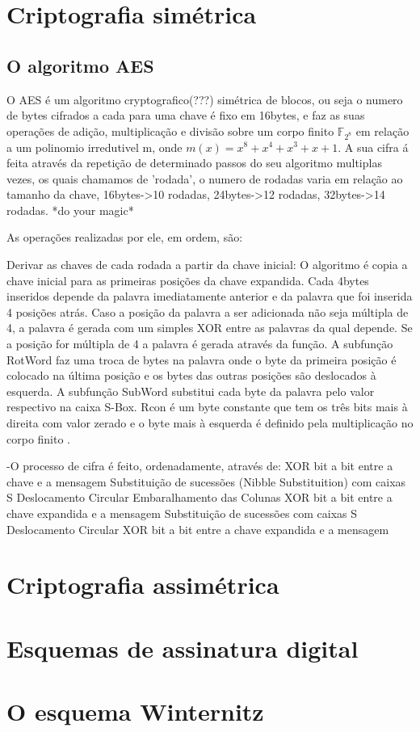 \documentclass{article}
\begin{document}
\section*{Criptografia simétrica}

\subsection*{O algoritmo AES}

O AES é um algoritmo cryptografico(???) simétrica de blocos, ou seja o numero de bytes cifrados a cada para uma chave é fixo em 16bytes, e faz as suas operações de adição, multiplicação e divisão sobre um corpo finito $\mathbb{F}_{2^{8}}$ em relação a um polinomio irredutivel m, onde $m(x) = x^{8} + x^{4} + x^{3} + x + 1$. 
A sua cifra á feita através da repetição de determinado passos do seu algoritmo multiplas vezes, os quais chamamos de 'rodada', o numero de rodadas varia em relação ao tamanho da chave, 16bytes->10 rodadas, 24bytes->12 rodadas, 32bytes->14 rodadas. *do your magic*


As operações realizadas por ele, em ordem, são:

\begin{itemize}

Derivar as chaves de cada rodada a partir da chave inicial: O algoritmo é copia a chave inicial para as primeiras posições da chave expandida. Cada 4bytes inseridos depende da palavra imediatamente anterior e da palavra que foi inserida 4 posições atrás. Caso a posição da palavra a ser adicionada não seja múltipla de 4, a palavra é gerada com um simples XOR entre as palavras da qual depende. Se a posição for múltipla de 4 a palavra é gerada através da função. A subfunção RotWord faz uma troca de bytes na palavra onde o byte da primeira posição é colocado na última posição e os bytes das outras posições são deslocados à esquerda. A subfunção SubWord substitui cada byte da palavra pelo valor respectivo na caixa S-Box. Rcon é um byte constante que tem os três bits mais à direita com valor zerado e o byte mais à esquerda é definido pela multiplicação no corpo finito .



\end{itemize}
-O processo de cifra é feito, ordenadamente, através de: 
XOR bit a bit entre a chave e a mensagem
Substituição de sucessões (Nibble Substituition) com caixas S
Deslocamento Circular
Embaralhamento das Colunas
XOR bit a bit entre a chave expandida e a mensagem
Substituição de sucessões com caixas S
Deslocamento Circular
XOR bit a bit entre a chave expandida e a mensagem


\section*{Criptografia assimétrica}

\section*{Esquemas de assinatura digital}

\section*{O esquema Winternitz}


 
\end{document}

